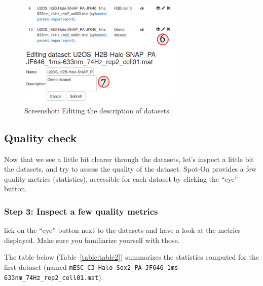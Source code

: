 \begin{figure}[h]
\centering
\includegraphics[width=0.7\textwidth]{../SPTGUI/static/SPTGUI/img/tutorial/0.7/tuto3.png}
\caption{\label{fig:tuto3}Screenshot: Editing the description of datasets.}
\end{figure}


\subsection{Quality check}
Now that we see a little bit clearer through the datasets, let's inspect a little bit the datasets, and try to assess the quality of the dataset. Spot-On provides a few quality metrics (statistics), accessible for each dataset by clicking the ``eye'' button.

\subsubsection{Step 3: Inspect a few quality metrics}
lick on the ``eye'' button next to the datasets and have a look at the metrics displayed. Make sure you familiarize yourself with those.

The table below (Table~\ref{table:table2}) summarizes the statistics computed for the first dataset (named \texttt{mESC\_C3\_Halo-Sox2\_PA-JF646\_1ms-633nm\_74Hz\_rep2\_cell01.mat}).

